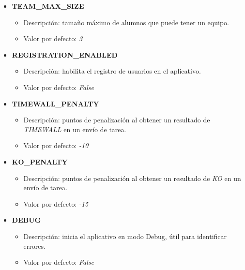 \documentclass[11pt,spanish,listoffigures,listoftables]{tfgetsinf}
\begin{document}
\begin{itemize}
	\item \textbf{TEAM\_MAX\_SIZE}
	\begin{itemize}
		\item Descripción: tamaño máximo de \Gls{alumno}s que puede tener un \Gls{equipo}.
		\item Valor por defecto: \textit{3}
	\end{itemize}
\end{itemize}

\begin{itemize}
	\item \textbf{REGISTRATION\_ENABLED}
	\begin{itemize}
		\item Descripción: habilita el registro de usuarios en el aplicativo.
		\item Valor por defecto: \textit{False}
	\end{itemize}
\end{itemize}

\begin{itemize}
	\item \textbf{TIMEWALL\_PENALTY}
	\begin{itemize}
		\item Descripción: puntos de penalización al obtener un resultado de \textit{TIMEWALL} en un envío de \Gls{tarea}.
		\item Valor por defecto: \textit{-10}
	\end{itemize}
\end{itemize}

\begin{itemize}
	\item \textbf{KO\_PENALTY}
	\begin{itemize}
		\item Descripción: puntos de penalización al obtener un resultado de \textit{KO} en un envío de \Gls{tarea}.
		\item Valor por defecto: \textit{-15}
	\end{itemize}
\end{itemize}

\begin{itemize}
	\item \textbf{DEBUG}
	\begin{itemize}
		\item Descripción: inicia el aplicativo en modo Debug, útil para identificar errores.
		\item Valor por defecto: \textit{False}
	\end{itemize}
\end{itemize}
\end{document}
